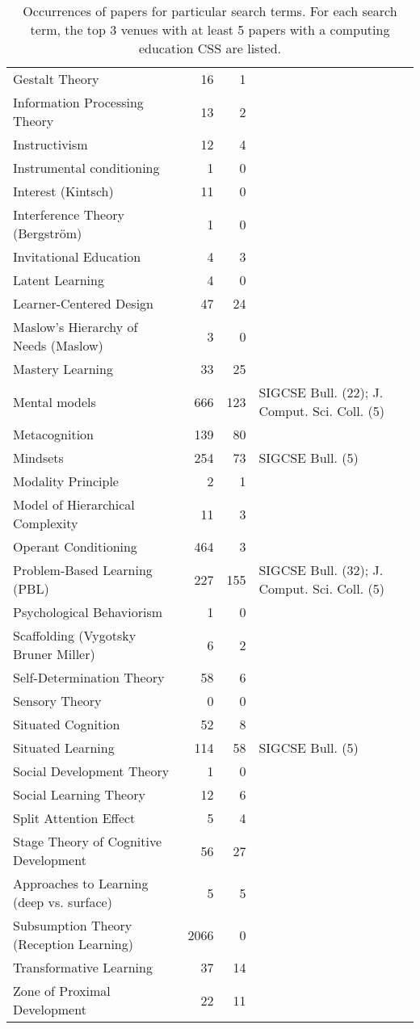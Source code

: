 \begin{table*}[t]
\begin{tabular}{lrrp{6cm}}
Gestalt Theory & 16 & 1 &  \\
Information Processing Theory & 13 & 2 &  \\
Instructivism & 12 & 4 &  \\
Instrumental conditioning & 1 & 0 &  \\
Interest (Kintsch) & 11 & 0 &  \\
Interference Theory (Bergström) & 1 & 0 &  \\
Invitational Education & 4 & 3 &  \\
Latent Learning & 4 & 0 &  \\
Learner-Centered Design & 47 & 24 &  \\
Maslow's Hierarchy of Needs (Maslow) & 3 & 0 &  \\
Mastery Learning & 33 & 25 &  \\
Mental models & 666 & 123 & SIGCSE Bull. (22); J. Comput. Sci. Coll. (5) \\
Metacognition & 139 & 80 &  \\
Mindsets & 254 & 73 & SIGCSE Bull. (5) \\
Modality Principle & 2 & 1 &  \\
Model of Hierarchical Complexity & 11 & 3 &  \\
Operant Conditioning & 464 & 3 &  \\
Problem-Based Learning (PBL) & 227 & 155 & SIGCSE Bull. (32); J. Comput. Sci. Coll. (5) \\
Psychological Behaviorism & 1 & 0 &  \\
Scaffolding (Vygotsky Bruner Miller) & 6 & 2 &  \\
Self-Determination Theory & 58 & 6 &  \\
Sensory Theory & 0 & 0 &  \\
Situated Cognition & 52 & 8 &  \\
Situated Learning & 114 & 58 & SIGCSE Bull. (5) \\
Social Development Theory & 1 & 0 &  \\
Social Learning Theory & 12 & 6 &  \\
Split Attention Effect & 5 & 4 &  \\
Stage Theory of Cognitive Development & 56 & 27 &  \\
Approaches to Learning (deep vs. surface) & 5 & 5 &  \\
Subsumption Theory (Reception Learning) & 2066 & 0 &  \\
Transformative Learning & 37 & 14 &  \\
Zone of Proximal Development & 22 & 11 &  \\
\end{tabular}
\caption{Occurrences of papers for particular search terms. For each search term, the top 3 venues with at least 5 papers with a computing education CSS are listed.}
\end{table*}


